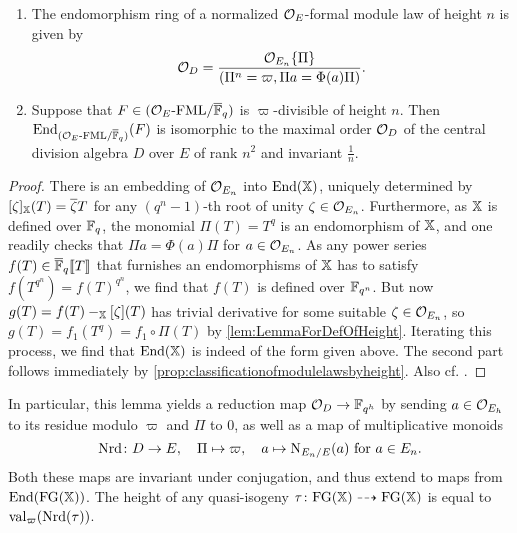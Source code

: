 \documentclass[../main.tex]{subfiles}
\begin{document}
\begin{prop}\label{prop:EndomorphismsOfFormalModulesOverksep}
  \begin{enumerate}
    \item The endomorphism ring of a normalized $\mathcal{O}_E$-formal module law of 
      height $n$ is given by 
      \begin{equation}\label{eq:DescripitionOfEnds}
        \mathcal{O}_D = \frac{\mathcal{O}_{E_n}\{\Pi\}}{(\Pi^n = \varpi, \Pi a = \Phi(a) \Pi)}.
      \end{equation}
    \item Suppose that $F \in {({\mathcal{O}_E}\textnormal-\allowbreak\mathrm{FML}/{{\overline{\mathbb{F}}_q}})}$ is $\varpi$-divisible
      of height $n$. Then 
      $\operatorname{End}_{{({\mathcal{O}_E}\textnormal-\allowbreak\mathrm{FML}/{{\overline {\mathbb{F}}_q}})}}(F)$ is isomorphic to the maximal order $\mathcal{O}_D$
      of the central division algebra $D$ over $E$ of rank $n^2$ and invariant
      $\frac 1n$.
  \end{enumerate}
  \begin{proof}
  There is an embedding of $\mathcal{O}_{E_n}$ into $\operatorname{End}(\mathbb{X})$, uniquely determined by
  $[\zeta]_{\mathbb{X}}(T) = \overline \zeta T$ for any $(q^n-1)$-th root of unity $\zeta \in
  \mathcal{O}_{E_n}$.
  Furthermore, as $\mathbb{X}$ is defined over $\mathbb{F}_q$, the monomial
  $\Pi(T) = T^q$ is an endomorphism of $\mathbb{X}$, and one readily checks that
  $\Pi a = \Phi(a) \Pi$ for $a \in \mathcal{O}_{E_n}$. As any power series $f(T) \in
  {\overline{\mathbb{F}}_q} \llbracket T \rrbracket$
  that furnishes an endomorphisms of $\mathbb{X}$ has to satisfy $f(T^{q^n}) = f(T)^{q^n}$,
  we find that $f(T)$ is defined over $\mathbb{F}_{q^n}$. But now 
  $g(T) = f(T) -_{\mathbb{X}} [\zeta](T)$ has trivial derivative for some suitable
  $\zeta \in \mathcal{O}_{E_n}$, so $g(T) = f_1(T^q) = f_1 \circ \Pi(T)$ by
  \cref{lem:LemmaForDefOfHeight}.
  Iterating this process, we find that $\operatorname{End}(\mathbb{X})$ is indeed of the form
  given above. The second part follows immediately by
  \cref{prop:classificationofmodulelawsbyheight}. Also cf.
  \cite[Proposition 1.7]{drinfel1974elliptic}.
\end{proof}
\end{prop}

In particular, this lemma yields a 
reduction map $\mathcal{O}_D \to \mathbb{F}_{q^h}$ by sending $a \in \mathcal{O}_{E_h}$ to
its residue modulo $\varpi$ and $\Pi$ to $0$, as well as a 
map of multiplicative monoids
$$\operatorname{Nrd}\colon D \to E, \quad \Pi \mapsto \varpi, \quad a \mapsto
\mathrm{N}_{E_n/E}(a) \text{ for } a \in E_n.$$
Both these maps are invariant under conjugation, and thus extend to maps
from $\operatorname{End}(\textnormal{FG}(\mathbb{X}))$. The height of any quasi-isogeny
$\tau\colon \textnormal{FG}(\mathbb{X}) \dashrightarrow \textnormal{FG}(\mathbb{X})$ is equal to $\mathrm{val}_\varpi(\operatorname{Nrd}(\tau))$.
\end{document}
